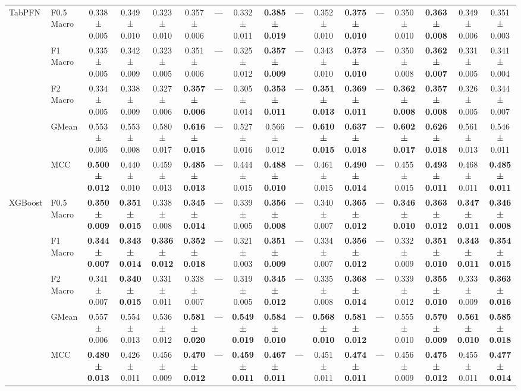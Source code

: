 \begin{table}[H]
{\begin{tabular}{llccccccccccccccc}
\cline{1-17}
\multirow[t]{5}{*}{TabPFN} & F0.5 Macro & 0.338 ± 0.005 & 0.349 ± 0.010 & 0.323 ± 0.010 & 0.357 ± 0.006 & — & 0.332 ± 0.011 & \textbf{0.385 ± 0.019} & — & 0.352 ± 0.010 & \textbf{0.375 ± 0.010} & — & 0.350 ± 0.010 & \textbf{0.363 ± 0.008} & 0.349 ± 0.006 & 0.351 ± 0.003 \\
 & F1 Macro & 0.335 ± 0.005 & 0.342 ± 0.009 & 0.323 ± 0.005 & 0.351 ± 0.006 & — & 0.325 ± 0.012 & \textbf{0.357 ± 0.009} & — & 0.343 ± 0.010 & \textbf{0.373 ± 0.010} & — & 0.350 ± 0.008 & \textbf{0.362 ± 0.007} & 0.331 ± 0.005 & 0.341 ± 0.004 \\
 & F2 Macro & 0.334 ± 0.005 & 0.338 ± 0.009 & 0.327 ± 0.006 & \textbf{0.357 ± 0.006} & — & 0.305 ± 0.014 & \textbf{0.353 ± 0.011} & — & \textbf{0.351 ± 0.013} & \textbf{0.369 ± 0.011} & — & \textbf{0.362 ± 0.008} & \textbf{0.357 ± 0.008} & 0.326 ± 0.005 & 0.344 ± 0.007 \\
 & GMean & 0.553 ± 0.005 & 0.553 ± 0.008 & 0.580 ± 0.017 & \textbf{0.616 ± 0.015} & — & 0.527 ± 0.016 & 0.566 ± 0.012 & — & \textbf{0.610 ± 0.015} & \textbf{0.637 ± 0.018} & — & \textbf{0.602 ± 0.017} & \textbf{0.626 ± 0.018} & 0.561 ± 0.013 & 0.546 ± 0.011 \\
 & MCC & \textbf{0.500 ± 0.012} & 0.440 ± 0.010 & 0.459 ± 0.013 & \textbf{0.485 ± 0.013} & — & 0.444 ± 0.015 & \textbf{0.488 ± 0.010} & — & 0.461 ± 0.015 & \textbf{0.490 ± 0.014} & — & 0.455 ± 0.015 & \textbf{0.493 ± 0.011} & 0.468 ± 0.011 & \textbf{0.485 ± 0.011} \\
\cline{1-17}
\multirow[t]{5}{*}{XGBoost} & F0.5 Macro & \textbf{0.350 ± 0.009} & \textbf{0.351 ± 0.015} & 0.338 ± 0.008 & \textbf{0.345 ± 0.014} & — & 0.339 ± 0.005 & \textbf{0.356 ± 0.008} & — & 0.340 ± 0.007 & \textbf{0.365 ± 0.012} & — & \textbf{0.346 ± 0.010} & \textbf{0.363 ± 0.012} & \textbf{0.347 ± 0.011} & \textbf{0.346 ± 0.008} \\
 & F1 Macro & \textbf{0.344 ± 0.007} & \textbf{0.343 ± 0.014} & \textbf{0.336 ± 0.012} & \textbf{0.352 ± 0.018} & — & 0.321 ± 0.003 & \textbf{0.351 ± 0.009} & — & 0.334 ± 0.007 & \textbf{0.356 ± 0.012} & — & 0.332 ± 0.009 & \textbf{0.351 ± 0.010} & \textbf{0.343 ± 0.011} & \textbf{0.354 ± 0.015} \\
 & F2 Macro & 0.341 ± 0.007 & \textbf{0.340 ± 0.015} & 0.331 ± 0.011 & 0.338 ± 0.007 & — & 0.319 ± 0.005 & \textbf{0.345 ± 0.012} & — & 0.335 ± 0.008 & \textbf{0.368 ± 0.014} & — & 0.339 ± 0.012 & \textbf{0.355 ± 0.010} & 0.333 ± 0.009 & \textbf{0.363 ± 0.016} \\
 & GMean & 0.557 ± 0.006 & 0.554 ± 0.013 & 0.536 ± 0.012 & \textbf{0.581 ± 0.020} & — & \textbf{0.549 ± 0.019} & \textbf{0.584 ± 0.010} & — & \textbf{0.568 ± 0.010} & \textbf{0.581 ± 0.012} & — & 0.555 ± 0.010 & \textbf{0.570 ± 0.009} & \textbf{0.561 ± 0.010} & \textbf{0.585 ± 0.018} \\
 & MCC & \textbf{0.480 ± 0.013} & 0.426 ± 0.011 & 0.456 ± 0.009 & \textbf{0.470 ± 0.012} & — & \textbf{0.459 ± 0.011} & \textbf{0.467 ± 0.011} & — & 0.451 ± 0.011 & \textbf{0.474 ± 0.011} & — & 0.456 ± 0.009 & \textbf{0.475 ± 0.012} & 0.455 ± 0.011 & \textbf{0.477 ± 0.014} \\
\cline{1-17}
\bottomrule
\end{tabular}
    }
\end{table}
